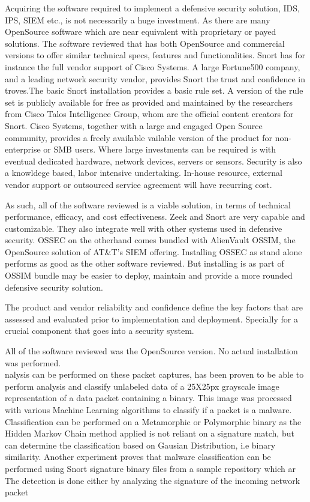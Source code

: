 Acquiring the software required to implement a defensive security solution, IDS, IPS, SIEM etc., is not necessarily a huge investment. As there are many OpenSource software which are near equivalent with proprietary or payed solutions. The software reviewed that has both OpenSource and commercial versions to offer similar technical specs, features and functionalities. Snort has for instance the full vendor support of Cisco Systems. A large Fortune500 company, and a leading network security vendor, provides Snort the trust and confidence in troves.The basic Snort installation provides a basic rule set. A version of the rule set is publicly available for free as provided and maintained by the researchers from Cisco Talos Intelligence Group, whom are the official content creators for Snort. Cisco Systems, together with a large and engaged Open Source community, provides a freely available vailable version of the product for non-enterprise or SMB users. Where large investments can be required is with eventual dedicated hardware, network devices, servers or sensors. Security is also a knowldege based, labor intensive undertaking. In-house resource, external vendor support or outsourced service agreement will have recurring cost.

As such, all of the software reviewed is a viable solution, in terms of technical performance, efficacy, and cost effectiveness. Zeek and Snort are very capable and customizable. They also integrate well with other systems used in defensive security. OSSEC on the otherhand comes bundled with AlienVault OSSIM, the OpenSource solution of AT\&T's SIEM offering. Installing OSSEC as stand alone performs as good as the other software reviewed. But installing is as part of OSSIM bundle may be easier to deploy, maintain and provide a more rounded defensive security solution.


The product and vendor reliability and confidence define the key factors that are assessed and evaluated prior to implementation and deployment. Specially for a crucial component that goes into a security system.

All of the software reviewed was the OpenSource version. No actual installation was performed.\\





nalysis can be performed on these packet captures,  has been proven to be able to perform analysis and classify unlabeled data of a 25X25px grayscale image representation of a data packet containing a binary. This image was processed with various Machine Learning algorithms to classify if a packet is a malware. Classification can be performed on a Metamorphic or Polymorphic binary as the Hidden Markov Chain method applied is not reliant on a signature match, but can determine the classification based on Gausian Distribution, i.e binary similarity. Another experiment proves that malware classification can be performed using Snort signature  binary files from a sample repository which ar \cite{8674233}  The detection is done either by analyzing the signature of the incoming network packet 


